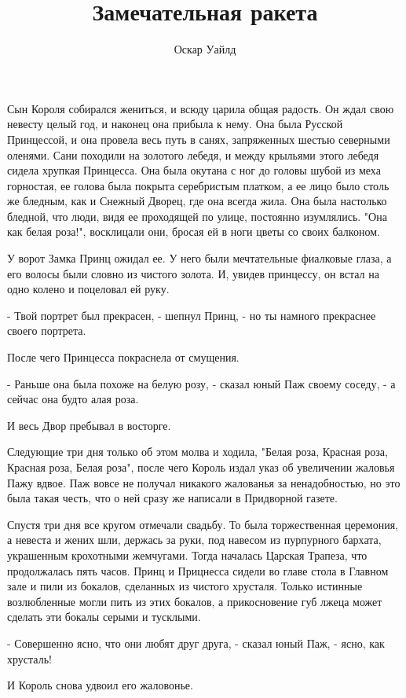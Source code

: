 \documentclass[a4paper]{article}
\date{}
\author{Оскар Уайлд}
\title{Замечательная ракета}
\theoremstyle{col}
\begin{document}
\maketitle

Сын Короля собирался жениться, и всюду царила общая радость. Он ждал свою невесту целый год, и наконец она прибыла к нему.
Она была Русской Принцессой, и она провела весь путь в санях, запряженных шестью северными оленями. Сани походили на золотого лебедя, и между крыльями этого лебедя сидела хрупкая Принцесса. Она была окутана с ног до головы шубой из меха горностая, ее голова была покрыта серебристым платком, а ее лицо было столь же бледным, как и Снежный Дворец, где она всегда жила. Она была настолько бледной, что люди, видя ее проходящей по улице, постоянно изумлялись. "Она как белая роза!", восклицали они, бросая ей в ноги цветы со своих балконом.

У ворот Замка Принц ожидал ее. У него были мечтательные фиалковые глаза, а его волосы были словно из чистого золота. И, увидев принцессу, он встал на одно колено и поцеловал ей руку.

- Твой портрет был прекрасен, - шепнул Принц, - но ты намного прекраснее своего портрета.

После чего Принцесса покраснела от смущения.

- Раньше она была похоже на белую розу, - сказал юный Паж своему соседу, - а сейчас она будто алая роза.

И весь Двор пребывал в восторге.

Следующие три дня только об этом молва и ходила, "Белая роза, Красная роза, Красная роза, Белая роза", после чего Король издал указ об увеличении жаловья Пажу вдвое. Паж вовсе не получал никакого жалованья за ненадобностью, но это была такая честь, что о ней сразу же написали в Придворной газете.

Спустя три дня все кругом отмечали свадьбу. То была торжественная церемония, а невеста и жених шли, держась за руки, под  навесом из пурпурного бархата, украшенным крохотными жемчугами. Тогда началась Царская Трапеза, что продолжалась пять часов. Принц и Прицнесса сидели во главе стола в Главном зале и пили из бокалов, сделанных из чистого хрусталя. Только истинные возлюбленные могли пить из этих бокалов, а прикосновение губ лжеца может сделать эти бокалы серыми и тусклыми.

- Совершенно ясно, что они любят друг друга, - сказал юный Паж, - ясно, как хрусталь!

И Король снова удвоил его жаловонье.
\end{document}
